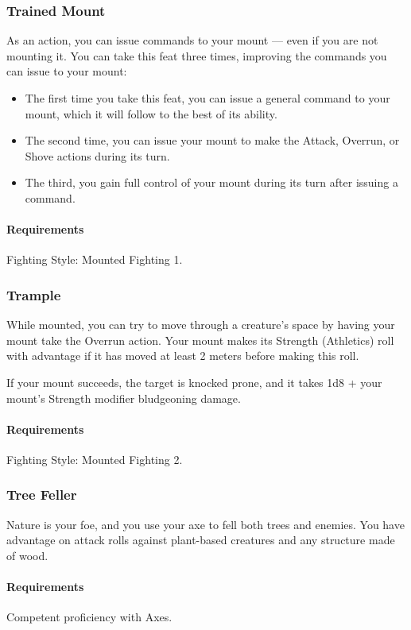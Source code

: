 \subsubsection{Trained Mount} \label{feat::trainedmount}
    As an action, you can issue commands to your mount --- even if you are not mounting it.
    You can take this feat three times, improving the commands you can issue to your mount:
    \begin{itemize}
        \item The first time you take this feat, you can issue a general command to your mount, which it will follow to the best of its ability.
        \item The second time, you can issue your mount to make the Attack, Overrun, or Shove actions during its turn.
        \item The third, you gain full control of your mount during its turn after issuing a command.
    \end{itemize}
    \paragraph{Requirements} Fighting Style: Mounted Fighting 1.
\subsubsection{Trample} \label{feat::trample}
    While mounted, you can try to move through a creature's space by having your mount take the Overrun action.
    Your mount makes its Strength (Athletics) roll with advantage if it has moved at least 2 meters before making this roll.

    If your mount succeeds, the target is knocked prone, and it takes 1d8 + your mount's Strength modifier bludgeoning damage.
    \paragraph{Requirements} Fighting Style: Mounted Fighting 2.
\subsubsection{Tree Feller} \label{feat::treefeller}
    Nature is your foe, and you use your axe to fell both trees and enemies.
    You have advantage on attack rolls against plant-based creatures and any structure made of wood.
    \paragraph{Requirements} Competent proficiency with Axes.
